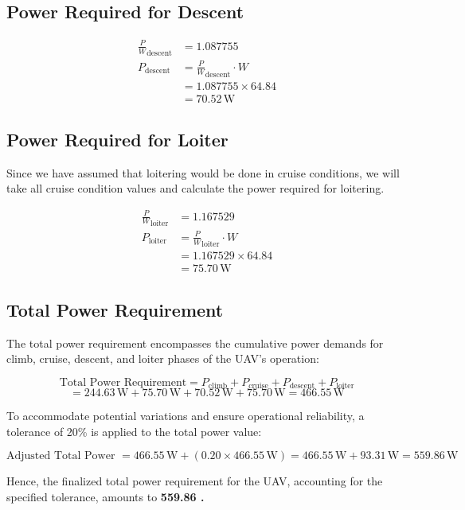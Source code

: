 \documentclass[12 pt]{article}
\begin{document}
\subsection {Power Required for Descent}
\begin{align*}
\frac{P}{W}_{\text{descent}} &= 1.087755 \\
P_{\text{descent}} &= \frac{P}{W}_{\text{descent}} \cdot W \\
&= 1.087755 \times 64.84 \\
&= 70.52 \, \text{W}
\end{align*}

\subsection {Power Required for Loiter}

Since we have assumed that loitering would be done in cruise conditions, we will take all cruise condition values and calculate the power required for loitering.

\begin{align*}
\frac{P}{W}_{\text{loiter}} &= 1.167529 \\
P_{\text{loiter}} &= \frac{P}{W}_{\text{loiter}} \cdot W \\
&= 1.167529 \times 64.84 \\
&= 75.70 \, \text{W}
\end{align*}
\subsection{Total Power Requirement}

The total power requirement encompasses the cumulative power demands for climb, cruise, descent, and loiter phases of the UAV's operation:

\[
\text{Total Power Requirement} = P_{\text{climb}} + P_{\text{cruise}} + P_{\text{descent}} + P_{\text{loiter}}
\]
\[
= 244.63 \, \text{W} + 75.70 \, \text{W} + 70.52 \, \text{W} + 75.70 \, \text{W} = 466.55 \, \text{W}
\]

To accommodate potential variations and ensure operational reliability, a tolerance of 20\% is applied to the total power value:

\[
\text{Adjusted Total Power } = 466.55 \, \text{W} + (0.20 \times 466.55 \, \text{W}) = 466.55 \, \text{W} + 93.31 \, \text{W} = 559.86 \, \text{W}
\]

Hence, the finalized total power requirement for the UAV, accounting for the specified tolerance, amounts to \textbf{ 559.86  . }
\end{document}

